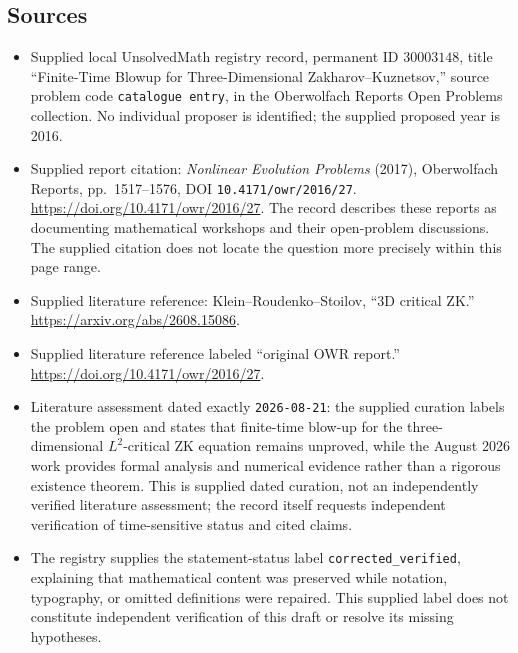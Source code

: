 \documentclass[11pt]{article}
\begin{document}
\subsection{Sources}
\begin{itemize}
\item Supplied local UnsolvedMath registry record, permanent ID \(30003148\), title ``Finite-Time Blowup for Three-Dimensional Zakharov--Kuznetsov,'' source problem code \texttt{catalogue entry}, in the Oberwolfach Reports Open Problems collection. No individual proposer is identified; the supplied proposed year is 2016.
\item Supplied report citation: \emph{Nonlinear Evolution Problems} (2017), Oberwolfach Reports, pp.\ 1517--1576, DOI \texttt{10.4171/owr/2016/27}. \url{https://doi.org/10.4171/owr/2016/27}. The record describes these reports as documenting mathematical workshops and their open-problem discussions. The supplied citation does not locate the question more precisely within this page range.
\item Supplied literature reference: Klein--Roudenko--Stoilov, ``3D critical ZK.'' \url{https://arxiv.org/abs/2608.15086}.
\item Supplied literature reference labeled ``original OWR report.'' \url{https://doi.org/10.4171/owr/2016/27}.
\item Literature assessment dated exactly \texttt{2026-08-21}: the supplied curation labels the problem open and states that finite-time blow-up for the three-dimensional \(L^2\)-critical ZK equation remains unproved, while the August 2026 work provides formal analysis and numerical evidence rather than a rigorous existence theorem. This is supplied dated curation, not an independently verified literature assessment; the record itself requests independent verification of time-sensitive status and cited claims.
\item The registry supplies the statement-status label \texttt{corrected\_verified}, explaining that mathematical content was preserved while notation, typography, or omitted definitions were repaired. This supplied label does not constitute independent verification of this draft or resolve its missing hypotheses.
\end{itemize}
\end{document}
